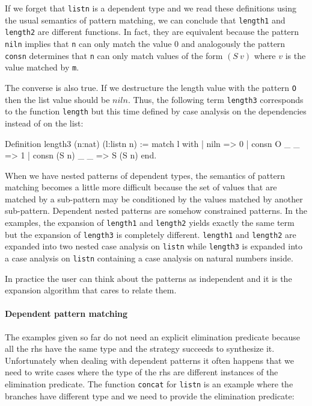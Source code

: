 If we forget that \texttt{listn} is a dependent type and we read these
definitions using the usual semantics of pattern matching,  we can conclude
that \texttt{length1}
and \texttt{length2} are different functions.
In fact, they are equivalent
because the pattern \texttt{niln} implies that \texttt{n} can only match
the value $0$ and analogously the pattern \texttt{consn} determines that \texttt{n} can
only match  values of the form  $(S~v)$ where $v$ is the value matched by
\texttt{m}.

The converse is also true. If
we destructure the  length  value with the pattern \texttt{O} then the list
value should be $niln$.
Thus, the following term \texttt{length3} corresponds to the function
\texttt{length} but this time defined by case analysis on the dependencies instead of on the list:

\begin{coq_example}
Definition length3 (n:nat) (l:listn n) :=
  match l with
  | niln => 0
  | consn O _ _ => 1
  | consn (S n) _ _ => S (S n)
  end.
\end{coq_example}

When we have nested patterns of dependent types, the semantics of
pattern matching becomes a little more difficult because
the set of values that are matched by a sub-pattern may be conditioned by the
values matched by another sub-pattern. Dependent nested patterns are
somehow constrained patterns.
In the examples, the expansion of
\texttt{length1} and \texttt{length2} yields exactly the same term
 but the
expansion of \texttt{length3} is completely different. \texttt{length1} and
\texttt{length2} are expanded into two nested case analysis on
\texttt{listn} while \texttt{length3} is expanded into a case analysis on
\texttt{listn} containing a case analysis on natural numbers inside.


In practice the user can think about the patterns as independent and
it is the expansion algorithm that cares to relate them. \\
\fi
%
%
%

\paragraph{Dependent pattern matching}
The examples  given so far do not need an explicit elimination predicate
 because all the rhs have the same type and the
strategy succeeds to synthesize it.
Unfortunately when dealing with dependent patterns it often happens
that we need to write cases where the type of the rhs are
different  instances of the elimination  predicate.
The function  \texttt{concat} for \texttt{listn}
is an example where the branches have different type
and we need to provide the elimination predicate:

